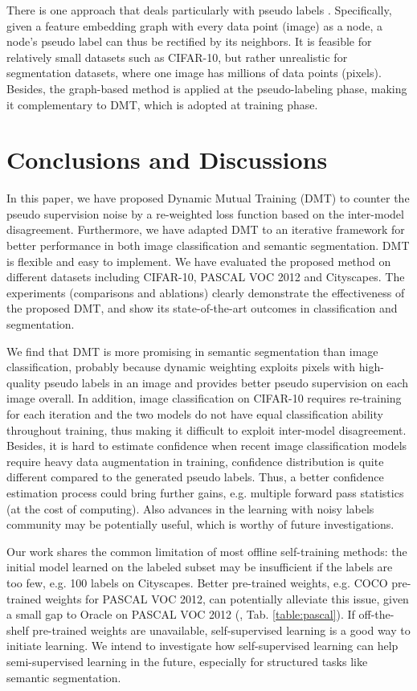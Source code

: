 \documentclass[preprint,review,10pt]{elsarticle}
\begin{document}
There is one approach that deals particularly with pseudo labels \cite{li2020density}. Specifically, given a feature embedding graph with every data point (image) as a node, a node's pseudo label can thus be rectified by its neighbors. It is feasible for relatively small datasets such as CIFAR-10, but rather unrealistic for segmentation datasets, where one image has millions of data points (pixels). Besides, the graph-based method is applied at the pseudo-labeling phase, making it complementary to DMT, which is adopted at training phase.



\section{Conclusions and Discussions}
\label{sec:7}
In this paper, we have proposed Dynamic Mutual Training (DMT) to counter the pseudo supervision noise by a re-weighted loss function based on the inter-model disagreement. Furthermore, we have adapted DMT to an iterative framework for better performance in both image classification and semantic segmentation. DMT is flexible and easy to implement.
We have evaluated the proposed method on different datasets including CIFAR-10, PASCAL VOC 2012 and Cityscapes.
The experiments (comparisons and ablations) clearly demonstrate the effectiveness of the proposed DMT, and show its state-of-the-art outcomes in classification and segmentation.

We find that DMT is more promising in semantic segmentation than image classification, probably because dynamic weighting exploits pixels with high-quality pseudo labels in an image and provides better pseudo supervision on each image overall. In addition, image classification on CIFAR-10 requires re-training for each iteration and the two models do not have equal classification ability throughout training, thus making it difficult to exploit inter-model disagreement. Besides, it is hard to estimate confidence when recent image classification models require heavy data augmentation in training, confidence distribution is quite different compared to the generated pseudo labels. Thus, a better confidence estimation process could bring further gains, e.g. multiple forward pass statistics (at the cost of computing). Also advances in the learning with noisy labels community may be potentially useful, which is worthy of future investigations.

Our work shares the common limitation of most offline self-training methods: the initial model learned on the labeled subset may be insufficient if the labels are too few, e.g. 100 labels on Cityscapes. Better pre-trained weights, e.g. COCO pre-trained weights for PASCAL VOC 2012, can potentially alleviate this issue, given a small gap to Oracle on PASCAL VOC 2012 (, Tab. \ref{table:pascal}). If off-the-shelf pre-trained weights are unavailable, self-supervised learning \cite{zhai2019s4l} is a good way to initiate learning. We intend to investigate how self-supervised learning can help semi-supervised learning in the future, especially for structured tasks like semantic segmentation.
\end{document}
